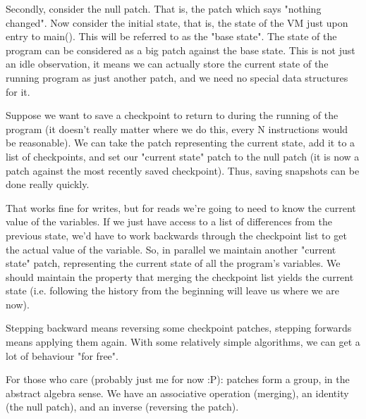 \documentclass[a4paper]{report}
\begin{document}
Secondly, consider the null patch. That is, the patch which says "nothing changed". Now consider the initial state, that is, the state of the VM just upon entry to main(). This will be referred to as the "base state". The state of the program can be considered as a big patch against the base state. This is not just an idle observation, it means we can actually store the current state of the running program as just another patch, and we need no special data structures for it.
\par
Suppose we want to save a checkpoint to return to during the running of the program (it doesn't really matter where we do this, every N instructions would be reasonable). We can take the patch representing the current state, add it to a list of checkpoints, and set our "current state" patch to the null patch (it is now a patch against the most recently saved checkpoint). Thus, saving snapshots can be done really quickly.
\par
That works fine for writes, but for reads we're going to need to know the current value of the variables. If we just have access to a list of differences from the previous state, we'd have to work backwards through the checkpoint list to get the actual value of the variable. So, in parallel we maintain another "current state" patch, representing the current state of all the program's variables. We should maintain the property that merging the checkpoint list yields the current state (i.e. following the history from the beginning will leave us where we are now).
\par
Stepping backward means reversing some checkpoint patches, stepping forwards means applying them again. With some relatively simple algorithms, we can get a lot of behaviour "for free".
\par
For those who care (probably just me for now :P): patches form a group, in the abstract algebra sense. We have an associative operation (merging), an identity (the null patch), and an inverse (reversing the patch).
\end{document}
